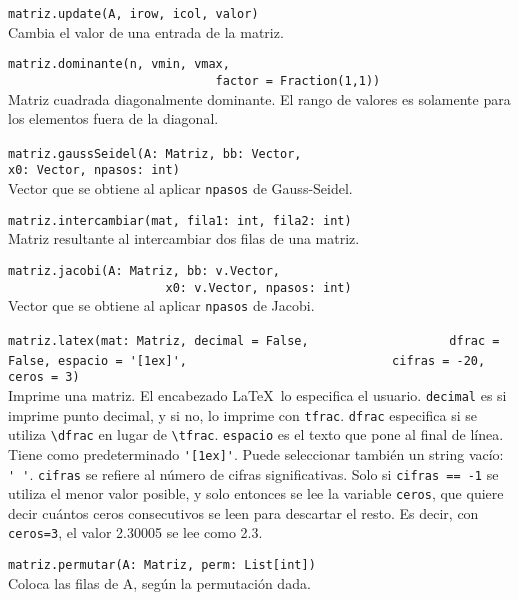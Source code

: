 \documentclass[10pt,landscape]{article}
\begin{document}
\begin{multicols}{3}
\begin{asparaitem}
\item \verb|matriz.update(A, irow, icol, valor)| \\
  \quad Cambia el valor de una entrada de la matriz.

\item \verb|matriz.dominante(n, vmin, vmax,| \\
  \verb|                             factor = Fraction(1,1))| \\
    \quad Matriz cuadrada diagonalmente dominante. El rango de valores es solamente para los elementos fuera de la diagonal.

\item \verb|matriz.gaussSeidel(A: Matriz, bb: Vector,|
  \verb|                            x0: Vector, npasos: int)|\\
  \quad Vector que se obtiene al aplicar \verb|npasos| de Gauss-Seidel.

\item \verb|matriz.intercambiar(mat, fila1: int, fila2: int)| \\
  \quad Matriz resultante al intercambiar dos filas de una matriz.

\item \verb|matriz.jacobi(A: Matriz, bb: v.Vector, |\\
      \verb|                      x0: v.Vector, npasos: int)| \\
      \quad Vector que se obtiene al aplicar \verb|npasos| de Jacobi.

\item \verb|matriz.latex(mat: Matriz, decimal = False,|
  \verb|                   dfrac = False, espacio = '[1ex]',|
  \verb|                            cifras = -20, ceros = 3)| \\
  \quad Imprime una matriz. El encabezado \LaTeX\  lo especifica el usuario. \verb|decimal| es si imprime punto decimal, y si no, lo imprime con \verb|tfrac|. \verb|dfrac| especifica si se utiliza \verb|\dfrac| en lugar de \verb|\tfrac|. \verb|espacio| es el texto que pone al final de l\'inea. Tiene como predeterminado \verb|'[1ex]'|. Puede seleccionar tambi\'en un string vac\'io: \verb|' '|. \verb|cifras| se refiere al n\'umero de cifras significativas. Solo si \verb|cifras == -1| se utiliza el menor valor posible, y solo entonces se lee la variable \verb|ceros|, que quiere decir cu\'antos ceros consecutivos se leen para descartar el resto. Es decir, con \verb|ceros=3|, el valor 2.30005 se lee como 2.3.

\item \verb|matriz.permutar(A: Matriz, perm: List[int])| \\
\quad Coloca las filas de A, según la permutación dada.


\end{asparaitem}
\end{multicols}
\end{document}
